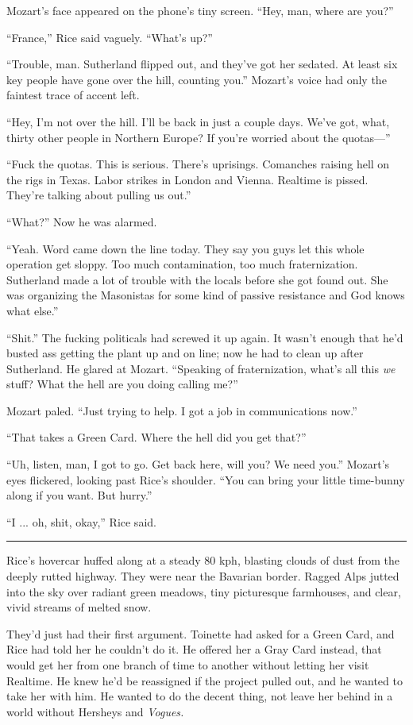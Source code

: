 Mozart's face appeared on the phone's tiny screen. ``Hey, man, where are you?''

``France,'' Rice said vaguely. ``What's up?''

``Trouble, man. Sutherland flipped out, and they've got her sedated. At least six key people have gone over the hill, counting you.'' Mozart's voice had only the faintest trace of accent left.

``Hey, I'm not over the hill. I'll be back in just a couple days. We've got, what, thirty other people in Northern Europe? If you're worried about the quotas—''

``Fuck the quotas. This is serious. There's uprisings. Comanches raising hell on the rigs in Texas. Labor strikes in London and Vienna. Realtime is pissed. They're talking about pulling us out.''

``What?'' Now he was alarmed.

``Yeah. Word came down the line today. They say you guys let this whole operation get sloppy. Too much contamination, too much fraternization. Sutherland made a lot of trouble with the locals before she got found out. She was organizing the Masonistas for some kind of passive resistance and God knows what else.''

``Shit.'' The fucking politicals had screwed it up again. It wasn't enough that he'd busted ass getting the plant up and on line; now he had to clean up after Sutherland. He glared at Mozart. ``Speaking of fraternization, what's all this \textit{we} stuff? What the hell are you doing calling me?''

Mozart paled. ``Just trying to help. I got a job in communications now.''

``That takes a Green Card. Where the hell did you get that?''

``Uh, listen, man, I got to go. Get back here, will you? We need you.'' Mozart's eyes flickered, looking past Rice's shoulder. ``You can bring your little time-bunny along if you want. But hurry.''

``I ... oh, shit, okay,'' Rice said.

\fancybreak{* * *}

Rice's hovercar huffed along at a steady 80 kph, blasting clouds of dust from the deeply rutted highway. They were near the Bavarian border. Ragged Alps jutted into the sky over radiant green meadows, tiny picturesque farmhouses, and clear, vivid streams of melted snow.

They'd just had their first argument. Toinette had asked for a Green Card, and Rice had told her he couldn't do it. He offered her a Gray Card instead, that would get her from one branch of time to another without letting her visit Realtime. He knew he'd be reassigned if the project pulled out, and he wanted to take her with him. He wanted to do the decent thing, not leave her behind in a world without Hersheys and \textit{Vogues.}

